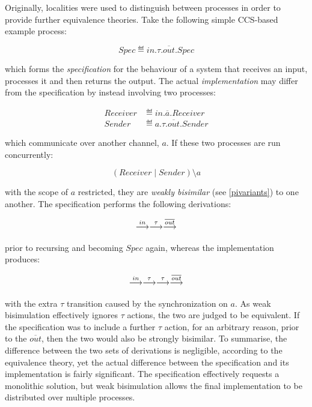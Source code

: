 Originally, localities were used to distinguish between processes in
order to provide further equivalence theories.  Take the following simple
CCS-based example process:

\begin{equation}
\label{lccsspec}
Spec \eqdef in.\tau.\overline{out}.Spec
\end{equation}

\noindent which forms the \emph{specification} for the behaviour of a
system that receives an input, processes it and then returns the output.
The actual \emph{implementation} may differ from the specification by
instead involving two processes:

\begin{align}
\label{lccs2proc}
Receiver & \eqdef in.\overline{a}.Receiver \\
Sender & \eqdef a.\tau.\overline{out}.Sender
\end{align}

\noindent which communicate over another channel, $a$.  If these two
processes are run concurrently:

\begin{equation}
(Receiver\;|\;Sender)\setminus a
\end{equation}

\noindent with the scope of $a$ restricted, they are \emph{weakly
bisimilar} (see \ref{pivariants}) to one another.  The specification
performs the following derivations:

\begin{equation}
  \stackrel{in}{\longrightarrow} \stackrel{\tau}{\longrightarrow} \stackrel{\overline{out}}{\longrightarrow}
\end{equation}

\noindent prior to recursing and becoming $Spec$ again, whereas the
implementation produces:

\begin{equation}
  \stackrel{in}{\longrightarrow} \stackrel{\tau}{\longrightarrow} \stackrel{\tau}{\longrightarrow} \stackrel{\overline{out}}{\longrightarrow}
\end{equation}

\noindent with the extra $\tau$ transition caused by the synchronization
on $a$.  As weak bisimulation effectively ignores $\tau$ actions, the
two are judged to be equivalent.  If the specification was to include a
further $\tau$ action, for an arbitrary reason, prior to the
$\overline{out}$, then the two would also be strongly bisimilar.  To
summarise, the difference between the two sets of derivations is
negligible, according to the equivalence theory, yet the actual
difference between the specification and its implementation is fairly
significant.  The specification effectively requests a monolithic
solution, but weak bisimulation allows the final implementation to be
distributed over multiple processes.

